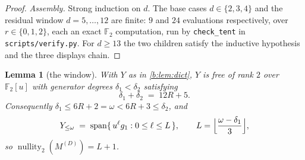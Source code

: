 \documentclass[11pt]{amsart}
\newtheorem{lemma}[theorem]{Lemma}
\theoremstyle{definition}
\theoremstyle{remark}
\begin{document}
\begin{proof}
\emph{Assembly.} Strong induction on $d$. The base cases $d \in \{2,3,4\}$ and the residual window $d = 5,\dots,12$ are finite: $9$ and $24$ evaluations respectively, over $r \in \{0,1,2\}$, each an exact $\mathbb{F}_2$ computation, run by \texttt{check\_tent} in \texttt{scripts/verify.py}. For $d \ge 13$ the two children satisfy the inductive hypothesis and the three displays chain.
\end{proof}

\begin{lemma}[the window]
\label{b:lem:window}
With $Y$ as in \cref{b:lem:dict}, $Y$ is free of rank $2$ over $\mathbb{F}_2[u]$ with generator degrees $\delta_1 < \delta_2$ satisfying
\[
  \delta_1 + \delta_2 \;=\; 12R + 5 .
\]
Consequently $\delta_1 \le 6R+2 = \omega < 6R+3 \le \delta_2$, and
\[
  Y_{\le \omega} \;=\; \operatorname{span}\{\,u^\ell g_1 : 0 \le \ell \le L\,\}, \qquad L = \Bigl\lfloor \frac{\omega - \delta_1}{3} \Bigr\rfloor,
\]
so $\operatorname{nullity}_2(M^{(D)}) = L+1$.
\end{lemma}
\end{document}
